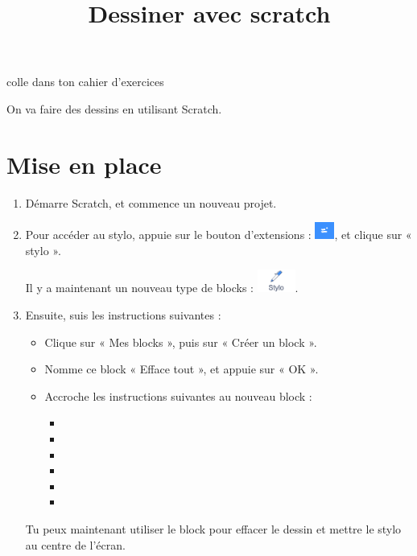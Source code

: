 \documentclass[a4paper,11pt]{article}
\title{Dessiner avec scratch}
\author{}
\date{}
\makeatletter
\renewcommand{\maketitle}{%
{\scriptsize colle dans ton cahier d'exercices}
	\begin{center}
		\LARGE
		\myuline{\@title}
		\vspace{1em}
	\end{center}
}
\makeatother
\begin{document}
\maketitle

On va faire des dessins en utilisant Scratch.

\section{Mise en place}

\begin{enumerate}[1)]
	\item Démarre Scratch, et commence un nouveau projet.
	\item Pour accéder au stylo, appuie sur le bouton d'extensions : \includegraphics[height=1.5em]{Images/Scratch 3 - bouton extensions.png}, et clique sur « stylo ».

	      Il y a maintenant un nouveau type de blocks : \includegraphics[height=2em]{Images/Scratch 3 - block stylos.png}.
	\item Ensuite, suis les instructions suivantes :
	      \begin{itemize}
		      \item Clique sur « Mes blocks », puis sur « Créer un block ».
		      \item Nomme ce block « Efface tout », et appuie sur « OK ».
		      \item Accroche les instructions suivantes au nouveau block :
		            \begin{itemize}
			            \item[] 
			            \item[] 
			            \item[] 
			            \item[] 
			            \item[] 
			            \item[] 
		            \end{itemize}
	      \end{itemize}
	      Tu peux maintenant utiliser le block  pour effacer le dessin et mettre le stylo au centre de l'écran.
\end{enumerate}
\end{document}
